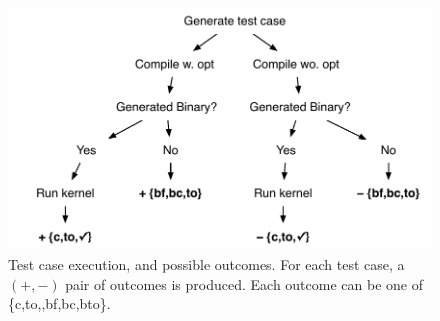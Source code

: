 \begin{figure}
  \centering %
  \includegraphics[width=\columnwidth]{img/test_process}%
  \caption{%
  	Test case execution, and possible outcomes. For each test case, a $(+,-)$ pair of outcomes is produced. Each outcome can be one of \{c,to,\cmark,bf,bc,bto\}.%
  }%
  \label{fig:test-process} %
\end{figure}

